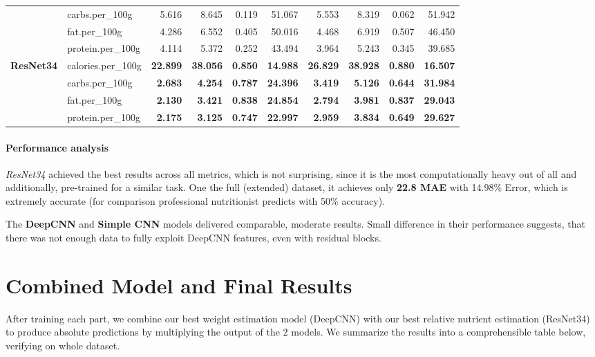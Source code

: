 \documentclass[a4paper]{article}
\begin{document}
\begin{table}[hbt!]
\begin{tabular}{llrrrrrrrr}
& carbs.per\_100g    & 5.616  & 8.645  & 0.119 & 51.067 & 5.553  & 8.319  & 0.062 & 51.942 \\
& fat.per\_100g      & 4.286  & 6.552  & 0.405 & 50.016 & 4.468  & 6.919  & 0.507 & 46.450 \\
& protein.per\_100g  & 4.114  & 5.372  & 0.252 & 43.494 & 3.964  & 5.243  & 0.345 & 39.685 \\
\midrule
\multirow{4}{*}{\textbf{ResNet34}} & calories.per\_100g & \textbf{22.899} & \textbf{38.056} & \textbf{0.850} & \textbf{14.988} & \textbf{26.829} & \textbf{38.928} & \textbf{0.880} & \textbf{16.507} \\
& carbs.per\_100g    & \textbf{2.683}  & \textbf{4.254}  & \textbf{0.787} & \textbf{24.396} & \textbf{3.419}  & \textbf{5.126}  & \textbf{0.644} & \textbf{31.984} \\
& fat.per\_100g      & \textbf{2.130}  & \textbf{3.421}  & \textbf{0.838} & \textbf{24.854} & \textbf{2.794}  & \textbf{3.981}  & \textbf{0.837} & \textbf{29.043} \\
& protein.per\_100g  & \textbf{2.175}  & \textbf{3.125}  & \textbf{0.747} & \textbf{22.997} & \textbf{2.959}  & \textbf{3.834}  & \textbf{0.649} & \textbf{29.627} \\
\bottomrule
\end{tabular}
\end{table}
\paragraph{Performance analysis} \textit{ResNet34} achieved the best results across all metrics, which is not surprising, since it is the most computationally heavy out of all and additionally, pre-trained for a similar task. One the full (extended) dataset, it achieves only \textbf{22.8 MAE} with 14.98\% Error, which is extremely accurate (for comparison professional nutritionist predicts with 50\% accuracy).

The \textbf{DeepCNN} and \textbf{Simple CNN} models delivered comparable, moderate results. Small difference in their performance suggests, that there was not enough data to fully exploit DeepCNN features, even with residual blocks. 


        \section{Combined Model and Final Results}
         After training each part, we combine our best weight estimation model (DeepCNN) with our best relative nutrient estimation (ResNet34) to produce absolute predictions by multiplying the output of the 2 models. We summarize the results into a comprehensible table below, verifying on whole dataset. 
\end{document}
